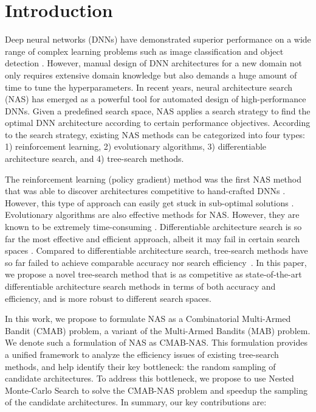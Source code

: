 \documentclass[conference]{IEEEtran}
\begin{document}
\section{Introduction}
\par
Deep neural networks (DNNs) have demonstrated superior performance on a wide range of complex learning problems such as image classification \cite{imagenet_cvpr09, krizhevsky2009learning} and object detection \cite{imagenet_cvpr09, ms_coco_2014}.
However, manual design of DNN architectures for a new domain not only requires extensive domain knowledge but also demands a huge amount of time to tune the hyperparameters.
In recent years, neural architecture search (NAS) has emerged as a powerful tool for automated design of high-performance DNNs.
Given a predefined search space, NAS applies a search strategy to find the optimal DNN architecture according to certain  performance objectives.
According to the search strategy, existing NAS methods can be categorized into four types: 1) reinforcement learning, 2) evolutionary algorithms, 3) differentiable architecture search, and 4) tree-search methods. 

The reinforcement learning (policy gradient) method was the first NAS method that was able to discover architectures competitive to hand-crafted DNNs \cite{zoph2017iclr, zoph2018learning}.
However, this type of approach can easily get stuck in sub-optimal solutions \cite{pham2018efficient, sutton2000policy}.
Evolutionary algorithms are also effective methods for NAS. However, they are known to be extremely time-consuming \cite{real2019regularized, DBLP:conf/gecco/LuWBDDGB19, DBLP:journals/corr/abs-2001-01233}.
Differentiable architecture search is so far the most effective and efficient approach, albeit it may fail in certain search spaces \cite{DBLP:conf/iclr/ZelaESMBH20}.
Compared to differentiable architecture search, tree-search methods have so far failed to achieve comparable accuracy nor search efficiency~\cite{negrinho2017deeparchitect, wistuba2017finding, liu2018progressive, wang2019alphax}.
In this paper, we propose a novel tree-search method that is as competitive as state-of-the-art differentiable architecture search methods in terms of both accuracy and efficiency, and is more robust to different search spaces.

In this work, we propose to formulate NAS as a Combinatorial Multi-Armed Bandit (CMAB) problem, a variant of the Multi-Armed Bandits (MAB) problem. We denote such a formulation of NAS as CMAB-NAS.
This formulation provides a unified framework to analyze the efficiency issues of existing tree-search methods, and help identify their key bottleneck: the random sampling of candidate architectures.
To address this bottleneck, we propose to use Nested Monte-Carlo Search to solve the CMAB-NAS problem and speedup the sampling of the candidate architectures.
In summary, our key contributions are:
\end{document}
